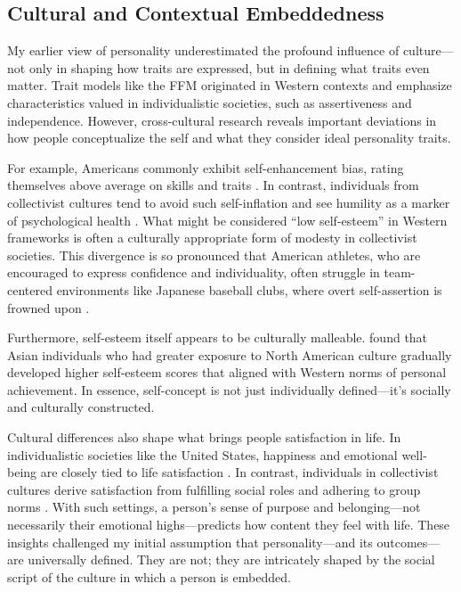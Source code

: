 \documentclass[stu]{apa7}
\begin{document}
\subsection{Cultural and Contextual Embeddedness}

My earlier view of personality underestimated the profound influence of culture—not only in shaping how traits are expressed, but in defining what traits even matter. Trait models like the FFM originated in Western contexts and emphasize characteristics valued in individualistic societies, such as assertiveness and independence. However, cross-cultural research reveals important deviations in how people conceptualize the self and what they consider ideal personality traits.

For example, Americans commonly exhibit self-enhancement bias, rating themselves above average on skills and traits \parencite{taylor1989positive}. In contrast, individuals from collectivist cultures tend to avoid such self-inflation and see humility as a marker of psychological health \parencite{heine2007self}. What might be considered “low self-esteem” in Western frameworks is often a culturally appropriate form of modesty in collectivist societies. This divergence is so pronounced that American athletes, who are encouraged to express confidence and individuality, often struggle in team-centered environments like Japanese baseball clubs, where overt self-assertion is frowned upon \parencite{whiting1989you}.

Furthermore, self-esteem itself appears to be culturally malleable. \textcite{heine1999is} found that Asian individuals who had greater exposure to North American culture gradually developed higher self-esteem scores that aligned with Western norms of personal achievement. In essence, self-concept is not just individually defined—it’s socially and culturally constructed.

Cultural differences also shape what brings people satisfaction in life. In individualistic societies like the United States, happiness and emotional well-being are closely tied to life satisfaction \parencite{diener1995cross}. In contrast, individuals in collectivist cultures derive satisfaction from fulfilling social roles and adhering to group norms
\parencite{oishi2007dynamics,steger2008meaningful}. With such settings, a person’s sense of purpose and belonging—not necessarily their emotional highs—predicts how content they feel with life. These insights challenged my initial assumption that personality—and its outcomes—are universally defined. They are not; they are intricately shaped by the social script of the culture in which a person is embedded.
\end{document}
